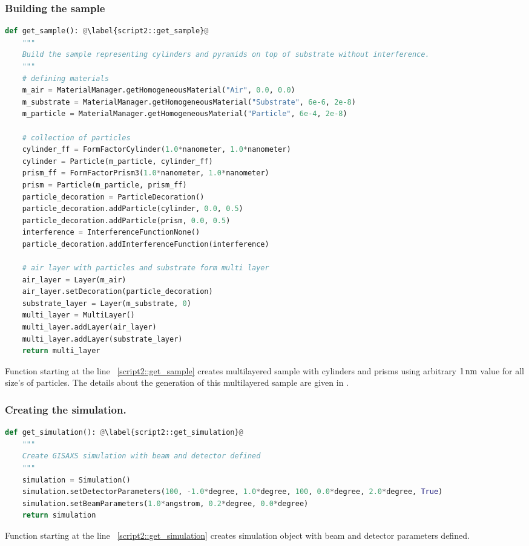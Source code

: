 \subsubsection*{Building the sample}
\begin{lstlisting}[language=python, style=eclipseboxed, firstnumber=5]
def get_sample(): @\label{script2::get_sample}@
    """
    Build the sample representing cylinders and pyramids on top of substrate without interference.
    """
    # defining materials
    m_air = MaterialManager.getHomogeneousMaterial("Air", 0.0, 0.0)
    m_substrate = MaterialManager.getHomogeneousMaterial("Substrate", 6e-6, 2e-8)
    m_particle = MaterialManager.getHomogeneousMaterial("Particle", 6e-4, 2e-8)

    # collection of particles
    cylinder_ff = FormFactorCylinder(1.0*nanometer, 1.0*nanometer)
    cylinder = Particle(m_particle, cylinder_ff)
    prism_ff = FormFactorPrism3(1.0*nanometer, 1.0*nanometer)
    prism = Particle(m_particle, prism_ff)
    particle_decoration = ParticleDecoration()
    particle_decoration.addParticle(cylinder, 0.0, 0.5)
    particle_decoration.addParticle(prism, 0.0, 0.5)
    interference = InterferenceFunctionNone()
    particle_decoration.addInterferenceFunction(interference)

    # air layer with particles and substrate form multi layer
    air_layer = Layer(m_air)
    air_layer.setDecoration(particle_decoration)
    substrate_layer = Layer(m_substrate, 0)
    multi_layer = MultiLayer()
    multi_layer.addLayer(air_layer)
    multi_layer.addLayer(substrate_layer)
    return multi_layer
\end{lstlisting}
Function starting at the line ~\ref{script2::get_sample} creates multilayered sample
with cylinders and prisms using arbitrary $1\,{\rm nm}$ value for all size's of particles.
The details about the generation of this multilayered sample are given in .


\subsubsection*{Creating the simulation.}
\begin{lstlisting}[language=python, style=eclipseboxed, firstnumber=35]
def get_simulation(): @\label{script2::get_simulation}@
    """
    Create GISAXS simulation with beam and detector defined
    """
    simulation = Simulation()
    simulation.setDetectorParameters(100, -1.0*degree, 1.0*degree, 100, 0.0*degree, 2.0*degree, True)
    simulation.setBeamParameters(1.0*angstrom, 0.2*degree, 0.0*degree)
    return simulation
\end{lstlisting}
Function starting at the line ~\ref{script2::get_simulation} creates
simulation object with beam and detector parameters defined.



